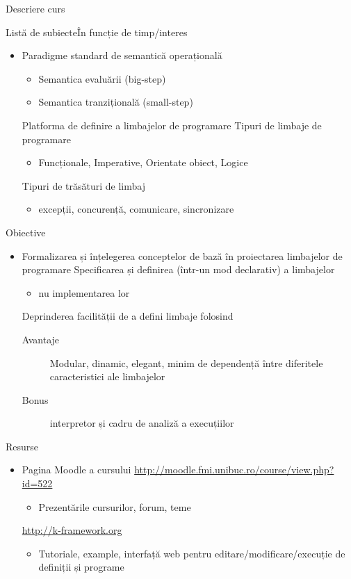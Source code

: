 \documentclass[xcolor=pdftex,romanian,colorlinks]{beamer}
\begin{document}
\begin{section}{Descriere curs}
\begin{frame}{Listă de subiecte}{În funcție de timp/interes}
\begin{itemize}
\item Paradigme standard de semantică operațională
\begin{itemize}
\item Semantica evaluării (big-step)
\item Semantica tranzițională (small-step)
\end{itemize}
\vitem Platforma \K de definire a limbajelor de programare
\vitem Tipuri de limbaje de programare
\begin{itemize}
\item Funcționale, Imperative, Orientate obiect, Logice
\end{itemize}
\vitem Tipuri de trăsături de limbaj
\begin{itemize}
\item excepții, concurență, comunicare, sincronizare
\end{itemize}
\end{itemize}
\end{frame}

\begin{frame}{Obiective}
\begin{itemize}
\item Formalizarea și înțelegerea conceptelor de bază în proiectarea limbajelor de programare
\vitem Specificarea și definirea (într-un mod declarativ) a limbajelor
\begin{itemize} \item nu implementarea lor
\end{itemize}
\vitem Deprinderea facilității de a defini limbaje folosind \K
\begin{description}
\item[Avantaje] Modular, dinamic, elegant, minim de dependență între diferitele caracteristici ale limbajelor
\item[Bonus] interpretor și cadru de analiză a execuțiilor
\end{description}
\end{itemize}
\end{frame}

\begin{frame}{Resurse}
\begin{itemize}
\item Pagina Moodle a cursului
 \url{http://moodle.fmi.unibuc.ro/course/view.php?id=522}
\begin{itemize}
\item Prezentările cursurilor, forum, teme
\end{itemize}
\vitem \url{http://k-framework.org}
\begin{itemize}
\item Tutoriale, example, interfață web pentru editare/modificare/execuție de definiții și programe
\end{itemize}
\end{itemize}
\end{frame}
\end{section}
\end{document}

